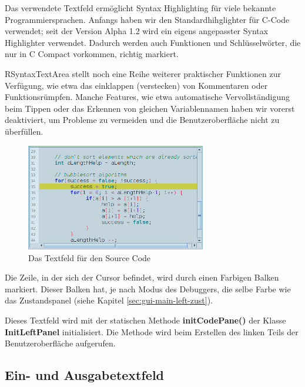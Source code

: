 Das verwendete Textfeld ermöglicht Syntax Highlighting für viele bekannte Programmiersprachen. Anfangs haben wir den Standardhihglighter für C-Code verwendet; seit der Version Alpha 1.2 wird ein eigens angepasster Syntax Highlighter verwendet. Dadurch werden auch Funktionen und Schlüsselwörter, die nur in C Compact vorkommen, richtig markiert.

RSyntaxTextArea stellt noch eine Reihe weiterer praktischer Funktionen zur Verfügung, wie etwa das einklappen (verstecken) von Kommentaren oder Funktionsrümpfen. Manche Features, wie etwa automatische Vervollständigung beim Tippen oder das Erkennen von gleichen Variablennamen haben wir vorerst deaktiviert, um Probleme zu vermeiden und die Benutzeroberfläche nicht zu überfüllen.

\begin{figure}[htbp] 
  \centering
     \includegraphics[width=0.7\textwidth]{./media/images/gui/main/CCompact-gui-left-code.png}
  \caption{Das Textfeld für den Source Code}
  \label{fig:gui-main-left-code}
\end{figure}

Die Zeile, in der sich der Cursor befindet, wird durch einen Farbigen Balken markiert. Dieser Balken hat, je nach Modus des Debuggers, die selbe Farbe wie das Zustandspanel (siehe Kapitel \ref{sec:gui-main-left-zust}).

Dieses Textfeld wird mit der statischen Methode \textbf{initCodePane()} der Klasse \textbf{InitLeftPanel} initialisiert. Die Methode wird beim Erstellen des linken Teils der Benutzeroberfläche aufgerufen.

\subsection{Ein- und Ausgabetextfeld}
\label{sec:gui-main-left-io}

